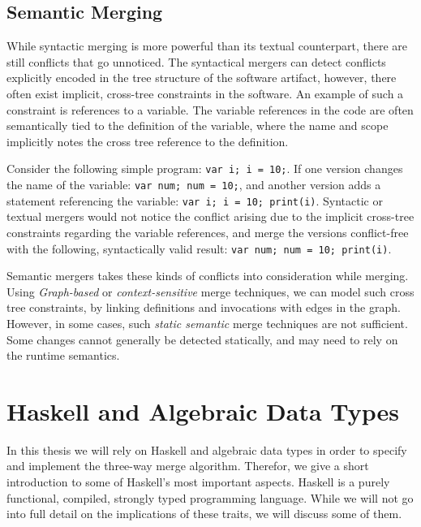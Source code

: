 \documentclass[a4paper,english]{ifimaster}
\begin{document}
\subsection{Semantic Merging}%
\label{sub:semantic_merging}

While syntactic merging is more powerful than its textual counterpart, there are still conflicts that go unnoticed. The syntactical mergers can detect conflicts explicitly encoded in the tree structure of the software artifact, however, there often exist implicit, cross-tree constraints in the software. An example of such a constraint is references to a variable. The variable references in the code are often semantically tied to the definition of the variable, where the name and scope implicitly notes the cross tree reference to the definition.

Consider the following simple program: \texttt{var i; i = 10;}. If one version changes the name of the variable: \texttt{var num; num = 10;}, and another version adds a statement referencing the variable: \texttt{var i; i = 10; print(i)}. Syntactic or textual mergers would not notice the conflict arising due to the implicit cross-tree constraints regarding the variable references, and merge the versions conflict-free with the following, syntactically valid result: \texttt{var num; num = 10; print(i)}.

Semantic mergers takes these kinds of conflicts into consideration while merging. Using \textit{Graph-based}  or \textit{context-sensitive} merge techniques, we can model such cross tree constraints, by linking definitions and invocations with edges in the graph. However, in some cases, such \textit{static semantic} merge techniques are not sufficient. Some changes cannot generally be detected statically, and may need to rely on the runtime semantics.

\section{Haskell and Algebraic Data Types}%
\label{sec:haskell_and_algebraic_data_types}

In this thesis we will rely on Haskell and algebraic data types in order to specify and implement the three-way merge algorithm. Therefor, we give a short introduction to some of Haskell's most important aspects. Haskell is a purely functional, compiled, strongly typed programming language. While we will not go into full detail on the implications of these traits, we will discuss some of them.
\end{document}

